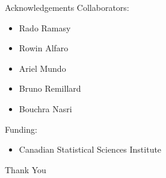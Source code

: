 \documentclass[14pt]{beamer}
\begin{document}
\begin{frame}{Acknowledgements}
    Collaborators:
    \begin{itemize}
        \item Rado Ramasy
        \item Rowin Alfaro
        \item Ariel Mundo
        \item Bruno Remillard
        \item Bouchra Nasri \newline
    \end{itemize}

    Funding:
    \begin{itemize}
        \item Canadian Statistical Sciences Institute
    \end{itemize}
\end{frame}

\begin{frame}
    \centering
    \Huge Thank You
\end{frame}
\end{document}
